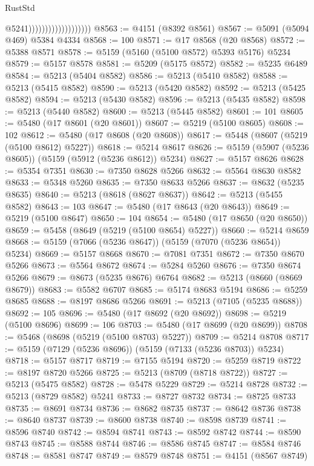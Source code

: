 \begin{lexlean}{RustStd}
\begin{coremodule}
                                          @5241)))))))))))))))))))
@8563 := @4151 (@8392 @8561)
@8567 := @5091 (@5094 @469) @5384 @4334
@8568 := 100
@8571 := @17 @8568 (@20 @8568)
@8572 := @5388 @8571
@8578 := @5159 (@5160 (@5100 @8572) @5393 @5176) @5234
@8579 := @5157 @8578
@8581 := @5209 (@5175 @8572)
@8582 := @5235 @6489
@8584 := @5213 (@5404 @8582)
@8586 := @5213 (@5410 @8582)
@8588 := @5213 (@5415 @8582)
@8590 := @5213 (@5420 @8582)
@8592 := @5213 (@5425 @8582)
@8594 := @5213 (@5430 @8582)
@8596 := @5213 (@5435 @8582)
@8598 := @5213 (@5440 @8582)
@8600 := @5213 (@5445 @8582)
@8601 := 101
@8605 := @5480 (@17 @8601 (@20 @8601))
@8607 := @5219 (@5100 @8605)
@8608 := 102
@8612 := @5480 (@17 @8608 (@20 @8608))
@8617 := @5448 (@8607 (@5219 (@5100 @8612) @5227))
@8618 := @5214 @8617
@8626 := @5159 (@5907 (@5236 @8605)) (@5159 (@5912 (@5236 @8612)) @5234)
@8627 := @5157 @8626
@8628 := @5354 @7351
@8630 := @7350 @8628 @5266
@8632 := @5564 @8630 @8582
@8633 := @5348 @5260
@8635 := @7350 @8633 @5266
@8637 := @8632 (@5235 @8635)
@8640 := @5213 (@8618 (@8627 @8637))
@8642 := @5213 (@5455 @8582)
@8643 := 103
@8647 := @5480 (@17 @8643 (@20 @8643))
@8649 := @5219 (@5100 @8647)
@8650 := 104
@8654 := @5480 (@17 @8650 (@20 @8650))
@8659 := @5458 (@8649 (@5219 (@5100 @8654) @5227))
@8660 := @5214 @8659
@8668 := @5159 (@7066 (@5236 @8647)) (@5159 (@7070 (@5236 @8654)) @5234)
@8669 := @5157 @8668
@8670 := @7081 @7351
@8672 := @7350 @8670 @5266
@8673 := @5564 @8672
@8674 := @5284 @5260
@8676 := @7350 @8674 @5266
@8679 := @8673 (@5235 @8676) @6764
@8682 := @5213 (@8660 (@8669 @8679))
@8683 := @5582 @6707
@8685 := @5174 @8683 @5194
@8686 := @5259 @8685
@8688 := @8197 @8686 @5266
@8691 := @5213 (@7105 (@5235 @8688))
@8692 := 105
@8696 := @5480 (@17 @8692 (@20 @8692))
@8698 := @5219 (@5100 @8696)
@8699 := 106
@8703 := @5480 (@17 @8699 (@20 @8699))
@8708 := @5468 (@8698 (@5219 (@5100 @8703) @5227))
@8709 := @5214 @8708
@8717 := @5159 (@7129 (@5236 @8696)) (@5159 (@7133 (@5236 @8703)) @5234)
@8718 := @5157 @8717
@8719 := @7155 @5194
@8720 := @5259 @8719
@8722 := @8197 @8720 @5266
@8725 := @5213 (@8709 (@8718 @8722))
@8727 := @5213 (@5475 @8582)
@8728 := @5478 @5229
@8729 := @5214 @8728
@8732 := @5213 (@8729 @8582) @5241
@8733 := @8727 @8732
@8734 := @8725 @8733
@8735 := @8691 @8734
@8736 := @8682 @8735
@8737 := @8642 @8736
@8738 := @8640 @8737
@8739 := @8600 @8738
@8740 := @8598 @8739
@8741 := @8596 @8740
@8742 := @8594 @8741
@8743 := @8592 @8742
@8744 := @8590 @8743
@8745 := @8588 @8744
@8746 := @8586 @8745
@8747 := @8584 @8746
@8748 := @8581 @8747
@8749 := @8579 @8748
@8751 := @4151 (@8567 @8749)

\end{coremodule}
\end{lexlean}
